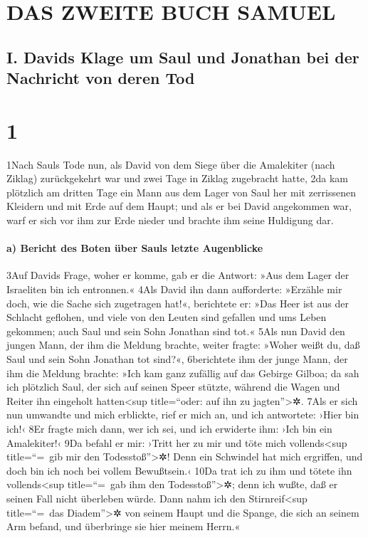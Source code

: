 \hypertarget{das-zweite-buch-samuel}{%
\section{DAS ZWEITE BUCH SAMUEL}\label{das-zweite-buch-samuel}}

\hypertarget{i.-davids-klage-um-saul-und-jonathan-bei-der-nachricht-von-deren-tod}{%
\subsection{I. Davids Klage um Saul und Jonathan bei der Nachricht von
deren
Tod}\label{i.-davids-klage-um-saul-und-jonathan-bei-der-nachricht-von-deren-tod}}

\hypertarget{section}{%
\section{1}\label{section}}

1Nach Sauls Tode nun, als David von dem Siege über die Amalekiter (nach
Ziklag) zurückgekehrt war und zwei Tage in Ziklag zugebracht hatte, 2da
kam plötzlich am dritten Tage ein Mann aus dem Lager von Saul her mit
zerrissenen Kleidern und mit Erde auf dem Haupt; und als er bei David
angekommen war, warf er sich vor ihm zur Erde nieder und brachte ihm
seine Huldigung dar.

\hypertarget{a-bericht-des-boten-uxfcber-sauls-letzte-augenblicke}{%
\paragraph{a) Bericht des Boten über Sauls letzte
Augenblicke}\label{a-bericht-des-boten-uxfcber-sauls-letzte-augenblicke}}

3Auf Davids Frage, woher er komme, gab er die Antwort: »Aus dem Lager
der Israeliten bin ich entronnen.« 4Als David ihn dann aufforderte:
»Erzähle mir doch, wie die Sache sich zugetragen hat!«, berichtete er:
»Das Heer ist aus der Schlacht geflohen, und viele von den Leuten sind
gefallen und ums Leben gekommen; auch Saul und sein Sohn Jonathan sind
tot.« 5Als nun David den jungen Mann, der ihm die Meldung brachte,
weiter fragte: »Woher weißt du, daß Saul und sein Sohn Jonathan tot
sind?«, 6berichtete ihm der junge Mann, der ihm die Meldung brachte:
»Ich kam ganz zufällig auf das Gebirge Gilboa; da sah ich plötzlich
Saul, der sich auf seinen Speer stützte, während die Wagen und Reiter
ihn eingeholt hatten\textless sup title=``oder: auf ihn zu
jagten''\textgreater✲. 7Als er sich nun umwandte und mich erblickte,
rief er mich an, und ich antwortete: ›Hier bin ich!‹ 8Er fragte mich
dann, wer ich sei, und ich erwiderte ihm: ›Ich bin ein Amalekiter!‹ 9Da
befahl er mir: ›Tritt her zu mir und töte mich vollends\textless sup
title=``=~gib mir den Todesstoß''\textgreater✲! Denn ein Schwindel hat
mich ergriffen, und doch bin ich noch bei vollem Bewußtsein.‹ 10Da trat
ich zu ihm und tötete ihn vollends\textless sup title=``=~gab ihm den
Todesstoß''\textgreater✲; denn ich wußte, daß er seinen Fall nicht
überleben würde. Dann nahm ich den Stirnreif\textless sup title=``=~das
Diadem''\textgreater✲ von seinem Haupt und die Spange, die sich an
seinem Arm befand, und überbringe sie hier meinem Herrn.«

